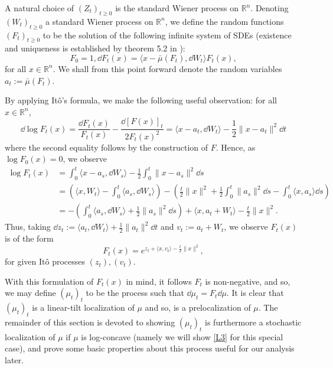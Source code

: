 A natural choice of \((Z_t)_{t \ge 0}\) is the standard Wiener process on \(\mathbb{R}^n\).
Denoting \((W_t)_{t \ge 0}\) a standard Wiener process on \(\mathbb{R}^n\), we define the random functions 
\((F_t)_{t \ge 0}\) to be the solution of the following infinite system of SDEs 
(existence and uniqueness is established by theorem 5.2 in \cite{Øksendal_2003}): 
\begin{equation}\label{eq:stoch_loc}
  F_0 = 1, \dd F_t(x) = \langle x - \bar{\mu}(F_t), \dd W_t \rangle F_t(x),
\end{equation}
for all \(x \in \mathbb{R}^n\). We shall from this point forward denote the random variables \(a_t := \bar{\mu}(F_t)\).

By applying Itô's formula, we make the following useful observation: for all \(x \in \mathbb{R}^n\),
\begin{equation}
  \dd \log F_t(x) = \frac{\dd F_t(x)}{F_t(x)} - \frac{\dd\hspace{0pt} [F(x)]_t}{2F_t(x)^2} 
    = \langle x - a_t, \dd W_t \rangle - \frac{1}{2}\|x - a_t\|^2 \dd t
\end{equation}
where the second equality follows by the construction of \(F\). Hence, as \(\log F_0(x) = 0\), we 
observe
\begin{align*}
  \log F_t(x) & = \int_0^t \langle x - a_s, \dd W_s \rangle - \frac{1}{2}\int_0^t \|x - a_s\|^2 \dd s\\
    & = \left(\langle x, W_t \rangle - \int_0^t \langle a_s, \dd W_s \rangle\right)
      - \left(\frac{t}{2}\|x\|^2 + \frac{1}{2}\int_0^t\|a_s\|^2 \dd s - \int_0^t \langle x, a_s \rangle \dd s\right)\\
    & = - \left(\int_0^t \langle a_s, \dd W_s \rangle + \frac{1}{2}\|a_s\|^2 \dd s\right) + 
      \langle x, a_t + W_t \rangle - \frac{t}{2}\|x\|^2.
\end{align*}
Thus, taking \(\dd z_t := \langle a_t, \dd W_t\rangle + \frac{1}{2} \|a_t\|^2 \dd t\) and 
\(v_t := a_t + W_t\), we observe \(F_t(x)\) is of the form
\begin{equation}\label{eq:stoch_loc_alt}
  F_t(x) = e^{z_t + \langle x, v_t \rangle - \frac{t}{2}\|x\|^2},
\end{equation}
for given Itô processes \((z_t), (v_t)\).

With this formulation of \(F_t(x)\) in mind, it follows \(F_t\) is non-negative, and so, 
we may define \((\mu_t)_t\) to be the process such that \(\dd \mu_t = F_t \dd \mu\). It is clear that 
\((\mu_t)_t\) is a linear-tilt localization of \(\mu\) and so, is a prelocalization of \(\mu\).
The remainder of this section is devoted to showing \((\mu_t)_t\) is furthermore a stochastic localization 
of \(\mu\) if \(\mu\) is log-concave (namely we will show \ref{L3} for this special case), and prove 
some basic properties about this process useful for our analysis later.

